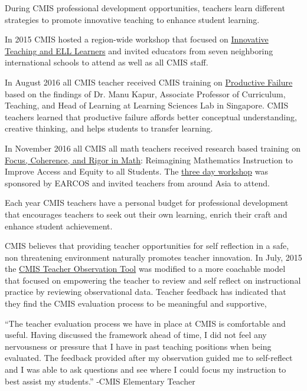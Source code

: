 \begin{findings}
During CMIS professional development opportunities, teachers learn different strategies to promote innovative teaching to enhance student learning.


In 2015 CMIS hosted a region-wide workshop that focused on \href{https://docs.google.com/forms/d/e/1FAIpQLSdK2QvcDZyM_yfhT22BgModehhwhn3I8Ps6VoW2EIzaK-qing/viewform?c=0&w=1}{ Innovative Teaching and  ELL Learners} and invited educators from seven neighboring international schools to attend as well as all CMIS staff. 

In August 2016 all CMIS teacher received CMIS training on \href{https://docs.google.com/a/cmis.ac.th/presentation/d/1S1x1yEj7KDD6jM7u1RdTZJEt10_0r6mcJ-LmRb6iPWs/edit?usp=sharing}{Productive Failure}  based on the findings of Dr. Manu Kapur, Associate Professor of Curriculum, Teaching, and Head of Learning at Learning Sciences Lab in Singapore. CMIS teachers learned that productive failure affords better conceptual understanding, creative thinking, and helps students to transfer learning.

In November 2016 all CMIS all math teachers received research based training on \href{https://drive.google.com/a/cmis.ac.th/file/d/0ByVFfrm0zfolSXFEZFJVN1VOaTQ/view?usp=sharing}{Focus, Coherence, and Rigor in Math}: Reimagining Mathematics Instruction to Improve Access and Equity to all Students. The \href{https://docs.google.com/document/d/14wHOzYz9lk79YGv4aYLtMEkqAN0Z6vBBI3POYZPeIC4/edit?usp=sharing}{three day workshop} was sponsored by EARCOS and invited teachers from around Asia to attend. 

Each year CMIS teachers have a personal budget for professional development that encourages teachers to seek out their own learning, enrich their craft and enhance student achievement.

CMIS believes that providing teacher opportunities for self reflection in a safe, non threatening environment naturally promotes teacher innovation. In July, 2015 the \href{https://docs.google.com/document/d/15_5X5QtixmWVheEUBVO9N1aislsLDm_ZW4-4g4YQ7F4/edit?usp=sharing}{CMIS Teacher Observation Tool} was modified to a more coachable model that  focused on empowering the teacher to review and self reflect on instructional practice by reviewing observational data. Teacher feedback has indicated that they find the CMIS evaluation process to be meaningful and supportive,

``The teacher evaluation process we have in place at CMIS is comfortable and useful. Having discussed the framework ahead of time, I did not feel any nervousness or pressure that I have in past teaching positions when being evaluated. The feedback provided after my observation guided me to self-reflect and I was able to ask questions and see where I could focus my instruction to best assist my students.'' -CMIS Elementary Teacher


\end{findings}
